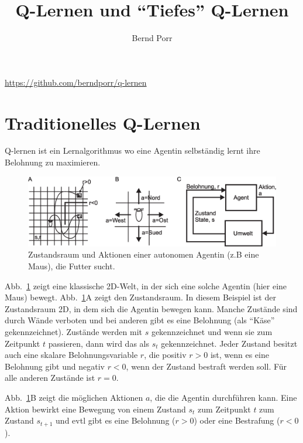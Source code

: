 \documentclass[12pt]{article}
\author{Bernd Porr}
\title{Q-Lernen und ``Tiefes'' Q-Lernen}
\begin{document}
\maketitle

\begin{center}
  \url{https://github.com/berndporr/q-lernen}
\end{center}

\section{Traditionelles Q-Lernen}

Q-lernen ist ein Lernalgorithmus wo eine Agentin selbständig
lernt ihre Belohnung zu maximieren.

\begin{figure}[!hbt]
\begin{center}
\mbox{\includegraphics[width=\textwidth]{state_action}}
\end{center}
\caption{Zustandsraum und Aktionen einer autonomen Agentin (z.B eine Maus),
  die Futter sucht.
\label{state_action}}
\end{figure}

Abb.~\ref{state_action} zeigt eine klassische 2D-Welt, in der sich
eine solche Agentin (hier eine Maus) bewegt. Abb.~\ref{state_action}A
zeigt den Zustandsraum. In diesem Beispiel ist der Zustandsraum 2D, in
dem sich die Agentin bewegen kann. Manche Zustände sind durch Wände
verboten und bei anderen gibt es eine Belohnung (als ``Käse''
gekennzeichnet). Zustände werden mit $s$ gekennzeichnet und wenn sie
zum Zeitpunkt $t$ passieren, dann wird das als $s_t$
gekennzeichnet. Jeder Zustand besitzt auch eine skalare
Belohnungsvariable $r$, die positiv $r>0$ ist, wenn es eine Belohnung gibt
und negativ $r<0$, wenn der Zustand bestraft werden soll. Für alle anderen
Zustände ist $r=0$.

Abb.~\ref{state_action}B zeigt die möglichen Aktionen $a$, die die
Agentin durchführen kann. Eine Aktion bewirkt eine Bewegung von einem
Zustand $s_t$ zum Zeitpunkt $t$ zum Zustand $s_{t+1}$ und evtl gibt
es eine Belohnung ($r>0$) oder eine Bestrafung ($r<0$).
\end{document}
